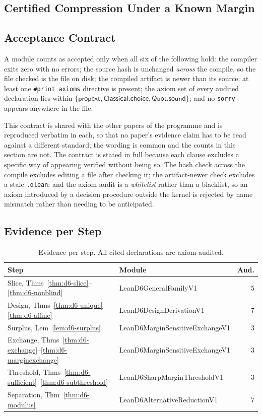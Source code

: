 \documentclass[conference]{IEEEtran}
\theoremstyle{definition}
\newcommand{\lean}[1]{\textsf{\footnotesize #1}}
\begin{document}
\subsection{Certified Compression Under a Known Margin}
\label{sec:d6-verification}

\subsection{Acceptance Contract}

A module counts as accepted only when all six of the following hold: the compiler exits zero
with no errors; the source hash is unchanged \emph{across} the compile, so the file checked is
the file on disk; the compiled artifact is newer than its source; at least one
\texttt{\#print axioms} directive is present; the axiom set of every audited declaration lies
within $\{\textsf{propext},\textsf{Classical.choice},\textsf{Quot.sound}\}$; and no
\texttt{sorry} appears anywhere in the file.

This contract is shared with the other papers of the programme and is reproduced verbatim in
each, so that no paper's evidence claim has to be read against a different standard; the
wording is common and the counts in this section are not. The contract is stated in full
because each clause excludes a specific way of appearing verified without being so. The hash check across the compile excludes editing a file after
checking it; the artifact-newer check excludes a stale \texttt{.olean}; and the axiom audit is
a \emph{whitelist} rather than a blacklist, so an axiom introduced by a decision procedure
outside the kernel is rejected by name mismatch rather than needing to be anticipated.

\subsection{Evidence per Step}

\begin{table}[htbp]
\caption{Evidence per step. All cited declarations are axiom-audited.}
\label{tab:d6-inventory}
\centering\footnotesize\setlength{\tabcolsep}{3pt}
\begin{tabular}{@{}llr@{}}
\toprule
Step & Module & Aud. \\
\midrule
Slice, Thms~\ref{thm:d6-slice}--\ref{thm:d6-nonblind} & \lean{LeanD6GeneralFamilyV1}       & 5 \\
Design, Thms~\ref{thm:d6-unique}--\ref{thm:d6-affine} & \lean{LeanD6DesignDerivationV1}    & 7 \\
Surplus, Lem~\ref{lem:d6-surplus}                  & \lean{LeanD6MarginSensitiveExchangeV1} & 3 \\
Exchange, Thms~\ref{thm:d6-exchange}--\ref{thm:d6-marginexchange} & \lean{LeanD6MarginSensitiveExchangeV1} & 3 \\
Threshold, Thms~\ref{thm:d6-sufficient}--\ref{thm:d6-subthreshold} & \lean{LeanD6SharpMarginThresholdV1} & 3 \\
Separation, Thm~\ref{thm:d6-modulus}               & \lean{LeanD6AlternativeReductionV1} & 7 \\
\bottomrule
\end{tabular}
\end{table}
\end{document}

